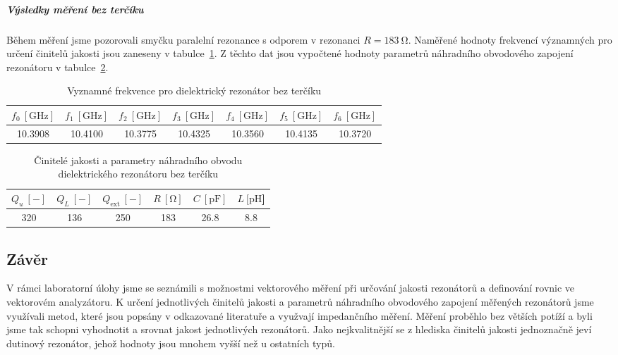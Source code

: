 \documentclass[11pt,a4paper]{article}
\newcommand{\Ohm}{\mathrm{\Omega}}
\newcommand{\GHz}{\mathrm{GHz}}
\begin{document}
\subparagraph*{Výsledky měření bez terčíku} Během měření jsme pozorovali smyčku paralelní rezonance s odporem v rezonanci $R = 183\ \Ohm$. Naměřené hodnoty frekvencí významných pro určení činitelů jakosti jsou zaneseny v tabulce~\ref{table:dielektricky-rezonator-bez-terciku-frekvence}. Z těchto dat jsou vypočtené hodnoty parametrů náhradního obvodového zapojení rezonátoru v tabulce~\ref{table:dielektricky-rezonator-bez-terciku-hodnoty}.
\begin{table}[!ht]
\centering
\begin{tabular}{|c|c|c|c|c|c|c|}
    \hline
    $f_0\ [\GHz]$ & $f_1\ [\GHz]$ & $f_2\ [\GHz]$ & $f_3\ [\GHz]$ & $f_4\ [\GHz]$ & $f_5\ [\GHz]$ & $f_6\ [\GHz]$\\
    \hline\hline
    10.3908 & 10.4100 & 10.3775 & 10.4325 & 10.3560 & 10.4135 & 10.3720\\
    \hline
\end{tabular}
\caption{\label{table:dielektricky-rezonator-bez-terciku-frekvence}Vyznamné frekvence pro dielektrický rezonátor bez terčíku}
\end{table}
\begin{table}[!ht]
\centering
\begin{tabular}{|c|c|c|c|c|c|}
    \hline
    $Q_u\ [-]$ & $Q_L\ [-]$ & $Q_{\mathrm{ext}}\ [-]$ & $R\ [\mathrm{\Omega}]$ & $C\ [\mathrm{pF}]$ & $L\ [\mathrm{pH}$]\\
    \hline\hline
    320 & 136 & 250 & 183 & 26.8 & 8.8\\
    \hline
\end{tabular}
\caption{\label{table:dielektricky-rezonator-bez-terciku-hodnoty}Činitelé jakosti a parametry náhradního obvodu dielektrického rezonátoru bez terčíku}
\end{table}

\subsection*{Závěr}
V rámci laboratorní úlohy jsme se seznámili s možnostmi vektorového měření při určování jakosti rezonátorů a definování rovnic ve vektorovém analyzátoru. K určení jednotlivých činitelů jakosti a parametrů náhradního obvodového zapojení měřených rezonátorů jsme využívali metod, které jsou popsány v odkazované literatuře a využvají impedančního měření. Měření proběhlo bez větších potíží a byli jsme tak schopni vyhodnotit a srovnat jakost jednotlivých rezonátorů. Jako nejkvalitnější se z hlediska činitelů jakosti jednoznačně jeví dutinový rezonátor, jehož hodnoty jsou mnohem vyšší než u ostatních typů.
\end{document}
